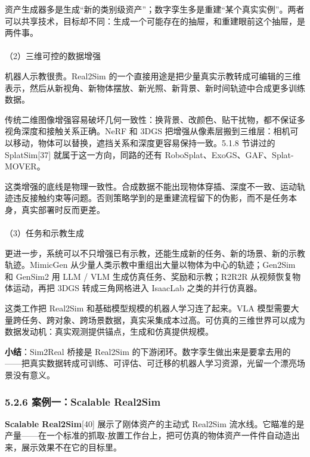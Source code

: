 \documentclass[
  chinese,
]{ctexart}
\makeatletter
\let\oldparagraph\paragraph
\renewcommand{\paragraph}{
    \@ifstar
      \xxxParagraphStar
      \xxxParagraphNoStar
  }
\newcommand{\xxxParagraphStar}[1]{\oldparagraph*{#1}\mbox{}}
\newcommand{\xxxParagraphNoStar}[1]{\oldparagraph{#1}\mbox{}}
\makeatother
\begin{document}
资产生成器多是生成``新的类别级资产''；数字孪生多是重建``某个真实实例''。两者可以共享技术，目标却不同：生成一个可能存在的抽屉，和重建眼前这个抽屉，是两件事。

\paragraph{（2）三维可控的数据增强}\label{ux4e09ux7ef4ux53efux63a7ux7684ux6570ux636eux589eux5f3a}

机器人示教很贵。Real2Sim
的一个直接用途是把少量真实示教转成可编辑的三维表示，然后从新视角、新物体摆放、新光照、新背景、新时间轨迹中合成更多训练数据。

传统二维图像增强容易破坏几何一致性：换背景、改颜色、贴干扰物，都不保证多视角深度和接触关系正确。NeRF
和 3DGS
把增强从像素层搬到三维层：相机可以移动，物体可以替换，遮挡关系和深度更容易保持一致。5.1.8
节讲过的 SplatSim{[}37{]} 就属于这一方向，同路的还有
RoboSplat、ExoGS、GAF、Splat-MOVER。

这类增强的底线是物理一致性。合成数据不能出现物体穿插、深度不一致、运动轨迹违反接触约束等问题。否则策略学到的是重建流程留下的伪影，而不是任务本身，真实部署时反而更差。

\paragraph{（3）任务和示教生成}\label{ux4efbux52a1ux548cux793aux6559ux751fux6210}

更进一步，系统可以不只增强已有示教，还能生成新的任务、新的场景、新的示教轨迹。MimicGen
从少量人类示教中重组出大量以物体为中心的轨迹；Gen2Sim 和 GenSim2 用 LLM
/ VLM 生成仿真任务、奖励和示教；R2R2R 从视频恢复物体运动，再把 3DGS
转成三角网格进入 IsaacLab 之类的并行仿真器。

这类工作把 Real2Sim 和基础模型规模的机器人学习连了起来。VLA
模型需要大量跨任务、跨对象、跨场景数据，真实采集成本过高。可仿真的三维世界可以成为数据发动机：真实观测提供锚点，生成和仿真提供规模。

\textbf{小结}：Sim2Real 桥接是 Real2Sim
的下游闭环。数字孪生做出来是要拿去用的------把真实数据转成可训练、可评估、可迁移的机器人学习资源，光留一个漂亮场景没有意义。

\subsubsection{5.2.6 案例一：Scalable
Real2Sim}\label{ux6848ux4f8bux4e00scalable-real2sim}

\textbf{Scalable Real2Sim}{[}40{]} 展示了刚体资产的主动式 Real2Sim
流水线。它瞄准的是产量------在一个标准的抓取-放置工作台上，把可仿真的物体资产一件件自动造出来，展示效果不在它的目标里。
\end{document}
